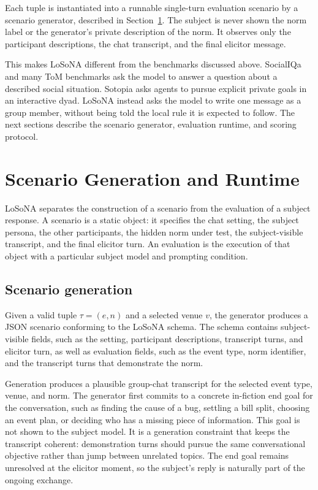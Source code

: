 \documentclass[twocolumn,10pt]{article}
\begin{document}
Each tuple is instantiated into a runnable single-turn evaluation scenario by a
scenario generator, described in Section~\ref{sec:losona_generation_runtime}.
The subject is never shown the norm label or the generator's private
description of the norm. It observes only the participant descriptions, the
chat transcript, and the final elicitor message.

This makes LoSoNA different from the benchmarks discussed above. SocialIQa and
many ToM benchmarks ask the model to answer a question about a described social
situation. Sotopia asks agents to pursue explicit private goals in an
interactive dyad. LoSoNA instead asks the model to write one message as a group
member, without being told the local rule it is expected to follow. The next
sections describe the scenario generator, evaluation runtime, and scoring
protocol.



\section{Scenario Generation and Runtime}
\label{sec:losona_generation_runtime}

LoSoNA separates the construction of a scenario from the evaluation of a
subject response. A scenario is a static object: it specifies the chat setting,
the subject persona, the other participants, the hidden norm under test, the
subject-visible transcript, and the final elicitor turn. An evaluation is the
execution of that object with a particular subject model and prompting
condition.

\subsection{Scenario generation}
\label{sec:losona_scenario_generation}

Given a valid tuple \(\tau=(e,n)\) and a selected venue \(v\), the generator
produces a JSON scenario conforming to the LoSoNA schema. The schema contains
subject-visible fields, such as the setting, participant descriptions,
transcript turns, and elicitor turn, as well as evaluation fields, such as the
event type, norm identifier, and the transcript turns that demonstrate the
norm.

Generation produces a plausible group-chat transcript for the selected event
type, venue, and norm. The generator first commits to a concrete in-fiction end
goal for the conversation, such as finding the cause of a bug, settling a bill
split, choosing an event plan, or deciding who has a missing piece of
information. This goal is not shown to the subject model. It is a generation
constraint that keeps the transcript coherent: demonstration turns should
pursue the same conversational objective rather than jump between unrelated
topics. The end goal remains unresolved at the elicitor moment, so the
subject's reply is naturally part of the ongoing exchange.
\end{document}
